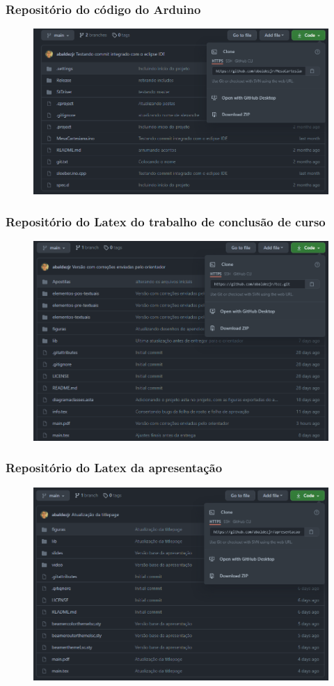 
\begin{frame}
    \frametitle{Repositório do código do Arduino}
    \begin{figure}
        \centering
        \includegraphics[scale = 0.3]{figuras/latexmesa}
    \end{figure}    
\end{frame}

\begin{frame}
    \frametitle{Repositório do Latex do trabalho de conclusão de curso}
    \begin{figure}
        \centering
        \includegraphics[scale = 0.3]{figuras/latextcc}
    \end{figure}    
\end{frame}

\begin{frame}
    \frametitle{Repositório do Latex da apresentação}
        \begin{figure}
            \centering
            \includegraphics[scale = 0.3]{figuras/latexapresentacao}
        \end{figure}
\end{frame}
